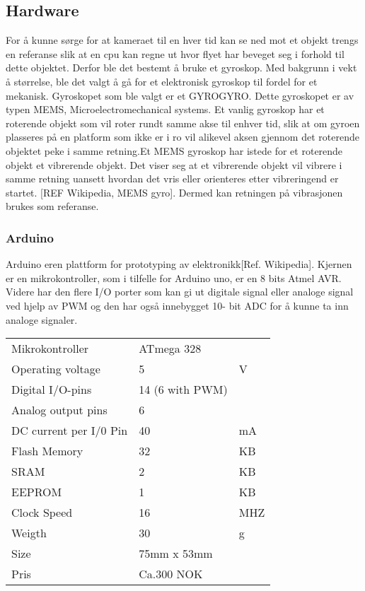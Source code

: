 \subsection{Hardware}
For å kunne sørge for at kameraet til en hver tid kan se ned mot et objekt trengs en referanse slik at en cpu kan regne ut hvor flyet har beveget seg i forhold til dette objektet. Derfor ble det bestemt å bruke et gyroskop. Med bakgrunn i vekt å størrelse, ble det valgt å gå for et elektronisk gyroskop til fordel for et mekanisk. Gyroskopet som ble valgt er et GYROGYRO. Dette gyroskopet er av typen MEMS, Microelectromechanical systems. Et vanlig gyroskop har et roterende objekt som vil roter rundt samme akse til enhver tid, slik at om gyroen plasseres på en platform som ikke er i ro vil alikevel aksen gjennom det roterende objektet peke i samme retning.Et MEMS gyroskop har istede for et roterende objekt et vibrerende objekt. Det viser seg at et vibrerende objekt vil vibrere i samme retning uansett hvordan det vris eller orienteres etter vibreringend er startet. [REF Wikipedia, MEMS gyro]. Dermed kan retningen på vibrasjonen brukes som referanse.

\subsubsection{Arduino}
Arduino eren plattform for prototyping av elektronikk[Ref. Wikipedia]. Kjernen er en mikrokontroller, som i tilfelle for Arduino uno, er en 8 bits Atmel AVR. Videre har den flere I/O porter som kan gi ut digitale signal eller analoge signal ved hjelp av PWM og den har også innebygget 10- bit ADC for å kunne ta inn analoge signaler.

\begin{table}
    \begin{tabular}{lll}
    	Mikrokontroller & ATmega 328 & ~ \\
    	Operating voltage & 5 & V \\
 	Digital I/O-pins & 14 (6 with PWM) & ~ \\
   	Analog output pins & 6 & ~ \\
	DC current per I/0 Pin & 40 & mA\\
	Flash Memory & 32 & KB \\
	SRAM & 2 & KB \\
	EEPROM & 1 & KB \\
	Clock Speed & 16 & MHZ \\
	Weigth & 30 & g \\
	Size & 75mm x 53mm & \\
	Pris & Ca.300 NOK & \\
    \end{tabular}
\end{table}

